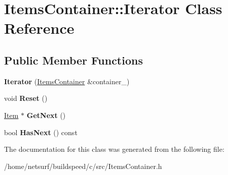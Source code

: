 \hypertarget{class_items_container_1_1_iterator}{}\section{Items\+Container\+:\+:Iterator Class Reference}
\label{class_items_container_1_1_iterator}
\subsection*{Public Member Functions}
\begin{DoxyCompactItemize}
\item 
{\bfseries Iterator} (\hyperlink{class_items_container}{Items\+Container} \&container\+\_\+)\hypertarget{class_items_container_1_1_iterator_a6874740b122450e322ac35b6b3f556ed}{}\label{class_items_container_1_1_iterator_a6874740b122450e322ac35b6b3f556ed}

\item 
void {\bfseries Reset} ()\hypertarget{class_items_container_1_1_iterator_aa2d6f31b2a31c3a52923e475813a24b2}{}\label{class_items_container_1_1_iterator_aa2d6f31b2a31c3a52923e475813a24b2}

\item 
\hyperlink{class_item}{Item} $\ast$ {\bfseries Get\+Next} ()\hypertarget{class_items_container_1_1_iterator_a33e4c357fcf13b1aaaa88fbe4dbab294}{}\label{class_items_container_1_1_iterator_a33e4c357fcf13b1aaaa88fbe4dbab294}

\item 
bool {\bfseries Has\+Next} () const \hypertarget{class_items_container_1_1_iterator_a57ccfac6e90ecc00700fb8f1127ecec2}{}\label{class_items_container_1_1_iterator_a57ccfac6e90ecc00700fb8f1127ecec2}

\end{DoxyCompactItemize}


The documentation for this class was generated from the following file\+:\begin{DoxyCompactItemize}
\item 
/home/netsurf/buildspeed/c/src/Items\+Container.\+h\end{DoxyCompactItemize}

